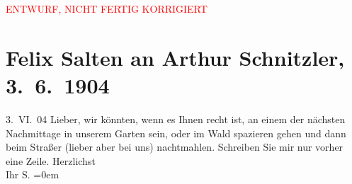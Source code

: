 
\begin{center}
            \textcolor{red}{ENTWURF, NICHT FERTIG KORRIGIERT}
                      \end{center}
            
         \renewcommand{\erwaehnteOrte}{Orte: Starkfriedgassse, Wien, Zum weißen Lamm}
         \renewcommand{\erwaehnteWerke}{}
               \section[Felix Salten an Arthur Schnitzler, 3. 6. 1904]{ Felix Salten an Arthur Schnitzler, 3. 6. 1904}\nopagebreak{}\rehead{ }\begin{ledgroupsized}[t]{13cm}\normalsize\beginnumbering \toendnotes[C]{\smallbreak\pagebreak[2]} 
\pstart
           \raggedleft{}{\pb}3. VI. 04\pend
           \pstart
           Lieber, wir könnten, wenn es Ihnen recht ist, an einem der nächsten
               Nachmittage in unserem Garten sein, oder im Wald spazieren gehen und dann beim Straßer (lieber aber bei uns) nachtmahlen. \pend
           \pstart
           Schreiben Sie mir nur vorher eine Zeile. \pend
           \pstart
           Herzlichst {\\[\baselineskip]}Ihr \spacefill\mbox{S.}\pend
           \leftskip=0em{}
         
         \endnumbering{}\end{ledgroupsized}\begin{anhang}\end{anhang}\newcommand{\dateiname}{L03397}\newcommand{\titel}{Felix Salten an Arthur Schnitzler, 3. 6. 1904}\newcommand{\editorInnen}{Martin Anton Müller und Laura Untner}
      